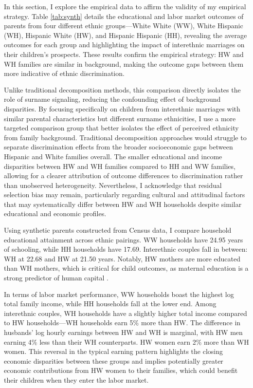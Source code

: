 In this section, I explore the empirical data to affirm the validity of my empirical strategy. Table \ref{tab:synth} details the educational and labor market outcomes of parents from four different ethnic groups—White White (WW), White Hispanic (WH), Hispanic White (HW), and Hispanic Hispanic (HH), revealing the average outcomes for each group and highlighting the impact of interethnic marriages on their children’s prospects. These results confirm the empirical strategy: HW and WH families are similar in background, making the outcome gaps between them more indicative of ethnic discrimination.

Unlike traditional decomposition methods, this comparison directly isolates the role of surname signaling, reducing the confounding effect of background disparities. By focusing specifically on children from interethnic marriages with similar parental characteristics but different surname ethnicities, I use a more targeted comparison group that better isolates the effect of perceived ethnicity from family background. Traditional decomposition approaches would struggle to separate discrimination effects from the broader socioeconomic gaps between Hispanic and White families overall. The smaller educational and income disparities between HW and WH families compared to HH and WW families, allowing for a clearer attribution of outcome differences to discrimination rather than unobserved heterogeneity. Nevertheless, I acknowledge that residual selection bias may remain, particularly regarding cultural and attitudinal factors that may systematically differ between HW and WH households despite similar educational and economic profiles.

Using synthetic parents constructed from Census data, I compare household educational attainment across ethnic pairings. WW households have 24.95 years of schooling, while HH households have 17.69. Interethnic couples fall in between: WH at 22.68 and HW at 21.50 years. Notably, HW mothers are more educated than WH mothers, which is critical for child outcomes, as maternal education is a strong predictor of human capital \autocite{gould2020does}.

In terms of labor market performance, WW households boast the highest log total family income, while HH households fall at the lower end.  Among interethnic couples, WH households have a slightly higher total income compared to HW households---WH households earn 5\% more than HW. The difference in husbands’ log hourly earnings between HW and WH is marginal, with HW men earning 4\% less than their WH counterparts. HW women earn 2\% more than WH women. This reversal in the typical earning pattern highlights the closing economic disparities between these groups and implies potentially greater economic contributions from HW women to their families, which could benefit their children when they enter the labor market.

